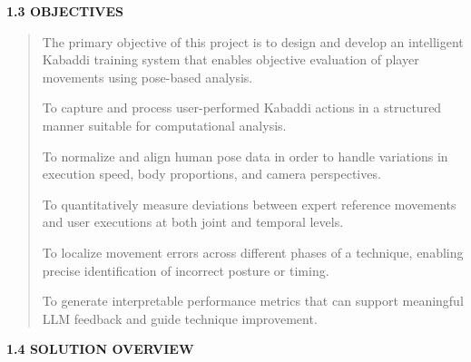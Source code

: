 \documentclass[
]{article}
\begin{document}
\textbf{1.3 OBJECTIVES}

\begin{quote}
The primary objective of this project is to design and develop an
intelligent Kabaddi training system that enables objective evaluation of
player movements using pose-based analysis.

To capture and process user-performed Kabaddi actions in a structured
manner suitable for computational analysis.

To normalize and align human pose data in order to handle variations in
execution speed, body proportions, and camera perspectives.

To quantitatively measure deviations between expert reference movements
and user executions at both joint and temporal levels.

To localize movement errors across different phases of a technique,
enabling precise identification of incorrect posture or timing.

To generate interpretable performance metrics that can support
meaningful LLM feedback and guide technique improvement.
\end{quote}

\textbf{1.4 SOLUTION OVERVIEW}
\end{document}
